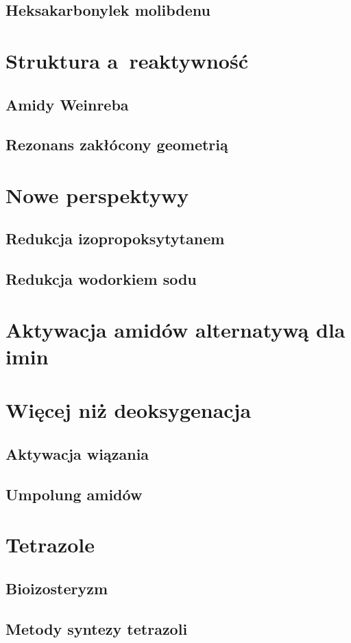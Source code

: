 \subsection{Heksakarbonylek molibdenu}

\section{Struktura a~reaktywność}
\subsection{Amidy Weinreba}
\subsection{Rezonans zakłócony geometrią}

\section{Nowe perspektywy}
\subsection{Redukcja izopropoksytytanem}
\subsection{Redukcja wodorkiem sodu}

\section{Aktywacja amidów alternatywą dla imin}

\section{Więcej niż deoksygenacja}
\subsection{Aktywacja wiązania }
\subsection{Umpolung amidów}

\section{Tetrazole}
\subsection{Bioizosteryzm}
\subsection{Metody syntezy tetrazoli}
